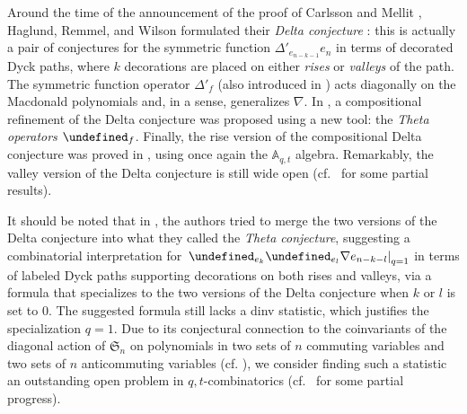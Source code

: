\documentclass[reqno]{amsart}
\theoremstyle{plain}
\theoremstyle{definition}
\theoremstyle{remark}
\newcommand{\A}{\mathbb{A}}%
\let\oldTheta\Theta
\let\Theta\undefined
\DeclareMathOperator{\Theta}{\oldTheta}
\newcommand{\<}{\langle}
\renewcommand{\>}{\rangle}
\begin{document}
Around the time of the announcement of the proof of Carlsson and Mellit \cite{CarlssonMellit2018ShuffleConjecture}, Haglund, Remmel, and Wilson formulated their \emph{Delta conjecture} \cite{HaglundRemmelWilson2018DeltaConjecture}: this is actually a pair of conjectures for the symmetric function $\Delta'_{e_{n-k-1}}e_n$ in terms of decorated Dyck paths, where $k$ decorations are placed on either \emph{rises} or \emph{valleys} of the path. The symmetric function operator $\Delta'_f$ (also introduced in \cite{BergeronGarsiaHaimanTesler1999IdentitiesPositivityConjectures}) acts diagonally on the Macdonald polynomials and, in a sense, generalizes $\nabla$. In \cite{DAdderioIraciVandenWyngaerd2021ThetaOperators}, a compositional refinement of the Delta conjecture was proposed using a new tool: the \emph{Theta operators} $\Theta_f$. Finally, the rise version of the compositional Delta conjecture was proved in \cite{DAdderioMellit2022CompositionalDelta}, using once again the $\A_{q,t}$ algebra. Remarkably, the valley version of the Delta conjecture is still wide open (cf.\ \cite{DAdderioIraci2023} for some partial results).

It should be noted that in \cite[Conjecture~9.1]{DAdderioIraciVandenWyngaerd2021ThetaOperators}, the authors tried to merge the two versions of the Delta conjecture into what they called the \emph{Theta conjecture}, suggesting a combinatorial interpretation for $\left. \Theta_{e_k} \Theta_{e_l} \nabla e_{n-k-l} \right\rvert_{q=1}$ in terms of labeled Dyck paths supporting decorations on both rises and valleys, via a formula that specializes to the two versions of the Delta conjecture when $k$ or $l$ is set to $0$. The suggested formula still lacks a dinv statistic, which justifies the specialization $q=1$. Due to its conjectural connection to the coinvariants of the diagonal action of $\mathfrak{S}_n$ on polynomials in two sets of $n$ commuting variables and two sets of $n$ anticommuting variables (cf. \cite[Section 8]{DAdderioIraciVandenWyngaerd2021ThetaOperators}), we consider finding such a statistic an outstanding open problem in $q,t$-combinatorics (cf.\ \cite{IraciNadeauVandenWyngaerd2024Smirnov} for some partial progress).
\end{document}

